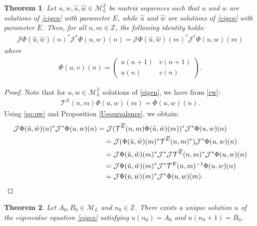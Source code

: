 \documentclass[12pt,oneside,onecolumn,open]{article}
\newtheorem{teo}{Theorem}[section]
\begin{document}
\begin{teo}
   Let \(u, w, \hat{u}, \hat{w} \in \mathcal{M}_L^{\mathbb{Z}}\) be matrix sequences such that \(u\) and \(w\) are solutions of \eqref{eigen} with parameter \(E\), while \(\hat{u}\) and \(\hat{w}\) are solutions of \eqref{eigen} with parameter \(\overline{E}\). Then, for all \(n, m \in \mathbb{Z}\), the following identity holds:
    \begin{align}\label{JPhi}
        \mathcal{J}\Phi(\hat{u}, \hat{w})(n)^{*}\mathcal{J}^{*}\Phi(u, w)(n) = \mathcal{J}\Phi(\hat{u}, \hat{w})(m)^{*}\mathcal{J}^{*}\Phi(u, w)(m)
    \end{align}
where
\begin{align}\label{Phi}
    \Phi(u, v)(n) = \begin{pmatrix}
        u(n+1) & v(n+1) \\
        u(n) & v(n)
    \end{pmatrix}.
\end{align}
\end{teo}
\begin{proof}
    Note that for $u, w \in \mathcal{M}_{L}^{\mathbb{Z}}$ solutions of \eqref{eigen}, we have from \eqref{rw}:
    \begin{align}\label{eq:uw}  
        \mathcal{T}^{E}(n, m)\Phi(u, w)(m) = \Phi(u, w)(n).
    \end{align}
    Using \eqref{eq:uw} and Proposition \ref{Uequivalence}, we obtain:
    \begin{align}
        \mathcal{J}\Phi(\hat{u}, \hat{w})(n)^{*}\mathcal{J}^{*}\Phi(u, w)(n)&= \mathcal{J}(\mathcal{T}^{\overline{E}}(n, m)\Phi(\hat{u}, \hat{w})(m))^{*}\mathcal{J}^{*}\Phi(u, w)(n) \\
        &\quad \notag= \mathcal{J}(\Phi(\hat{u}, \hat{w})(m)^{*}\mathcal{T}^{\overline{E}}(n, m)^{*})\mathcal{J}^{*}\Phi(u, w)(n) \\
        &\quad \notag= \mathcal{J}\Phi(\hat{u}, \hat{w})(m)^{*}\mathcal{J}^{*}\mathcal{J}\mathcal{T}^{\overline{E}}(n, m)^{*}\mathcal{J}^{*}\Phi(u, w)(n) \\
        &\quad \notag= \mathcal{J}\Phi(\hat{u}, \hat{w})(m)^{*}\mathcal{J}^{*}\mathcal{T}^{E}(n, m)^{-1}\Phi(u, w)(n) \\
        &\quad \notag= \mathcal{J}\Phi(\hat{u}, \hat{w})(m)^{*}\mathcal{J}^{*}\Phi(u, w)(m) .
    \end{align}
\end{proof}
 \begin{teo}\label{cauhyproblem}
   Let \(A_{0}, B_{0} \in \mathcal{M}_{L}\) and \(n_{0} \in \mathbb{Z}\). There exists a unique solution \(u\) of the eigenvalue equation \eqref{eigen} satisfying \(u(n_{0}) = A_{0}\) and \(u(n_{0}+1) = B_{0}\).
 \end{teo}
\end{document}
